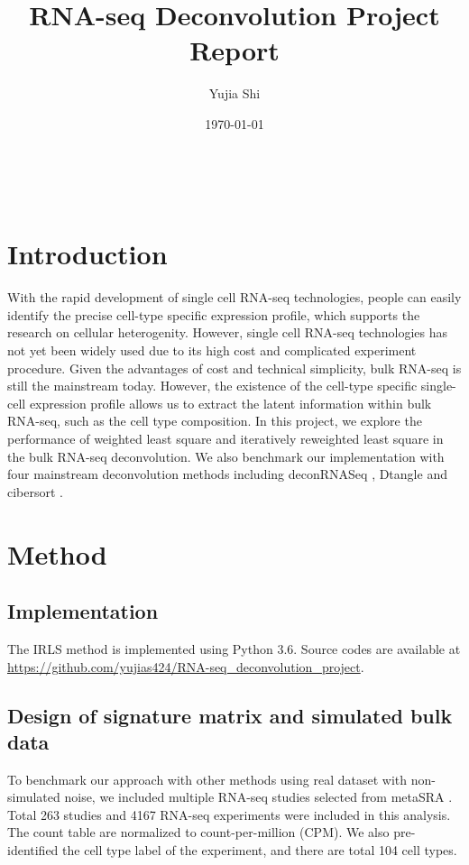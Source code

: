 \documentclass[10pt, a4paper, oneside]{article}
\title{RNA-seq Deconvolution Project Report}
\author{Yujia Shi}
\date{\today}
\begin{document}
\maketitle

\tableofcontents %
\section{Introduction}
With the rapid development of single cell RNA-seq technologies, people can easily identify the precise cell-type specific expression
profile, which supports the research on cellular heterogenity. However, single cell RNA-seq technologies has not yet been widely
used due to its high cost and complicated experiment procedure. Given the advantages of cost and technical simplicity, bulk RNA-seq
is still the mainstream today. However, the existence of the cell-type specific single-cell expression profile allows us to extract the latent
information within bulk RNA-seq, such as the cell type composition. In this project, we explore the performance of weighted least square and iteratively reweighted
least square in the bulk RNA-seq deconvolution. We also benchmark our implementation with four mainstream deconvolution methods including deconRNASeq \cite{gong2013deconrnaseq}, Dtangle\cite{hunt2019dtangle} and
cibersort \cite{newman2015robust}.
\section{Method} %

\subsection{Implementation} %
\justify 
The IRLS method is implemented using Python 3.6. Source codes are available at \url{https://github.com/yujias424/RNA-seq_deconvolution_project}.

\subsection{Design of signature matrix and simulated bulk data}
\justify
To benchmark our approach with other methods using real dataset with non-simulated noise, 
we included multiple RNA-seq studies selected from metaSRA \cite{bernstein2017metasra}.
Total 263 studies and 4167 RNA-seq experiments were included in this analysis. 
The count table are normalized to count-per-million (CPM). 
We also pre-identified the cell type label of the experiment, and there are total 104 cell types. 
\end{document}

